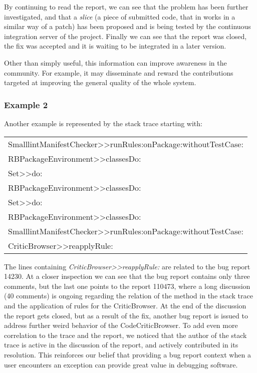 By continuing to read the report, we can see that the problem has been further investigated, and that a \emph{slice} (a piece of submitted code, that in \pha works in a similar way of a patch) has been proposed and is being tested by the continuous integration server of the project.
Finally we can see that the report was closed, the fix was accepted and it is waiting to be integrated in a later version.

Other than simply useful, this information can improve awareness in the community.
For example, it may disseminate and reward the contributions targeted at improving the general quality of the whole system.


\subsubsection{Example 2} Another example is represented by the stack trace starting with:

{\footnotesize
\begin{center}
\begin{tabular}{l}
SmalllintManifestChecker{>}{>}runRules:onPackage:withoutTestCase: \\
RBPackageEnvironment{>}{>}classesDo: \\
Set{>}{>}do: \\
RBPackageEnvironment{>}{>}classesDo: \\
Set{>}{>}do: \\
RBPackageEnvironment{>}{>}classesDo: \\
SmalllintManifestChecker{>}{>}runRules:onPackage:withoutTestCase: \\
CriticBrowser{>}{>}reapplyRule:
\end{tabular}
\end{center}}


The lines containing \emph{CriticBrowser{>}{>}reapplyRule:} are related to the bug report 14230.
At a closer inspection we can see that the bug report contains only three comments, but the last one points to the report 110473, where a long discussion (40 comments) is ongoing regarding the relation of the method in the stack trace and the application of rules for the CriticBrowser.
At the end of the discussion the report gets closed, but as a result of the fix, another bug report is issued to address further weird behavior of the CodeCriticBrowser.
To add even more correlation to the trace and the report, we noticed that the author of the stack trace is active in the discussion of the report, and actively contributed in its resolution.
This reinforces our belief that providing a bug report context when a user encounters an exception can provide great value in debugging software.




